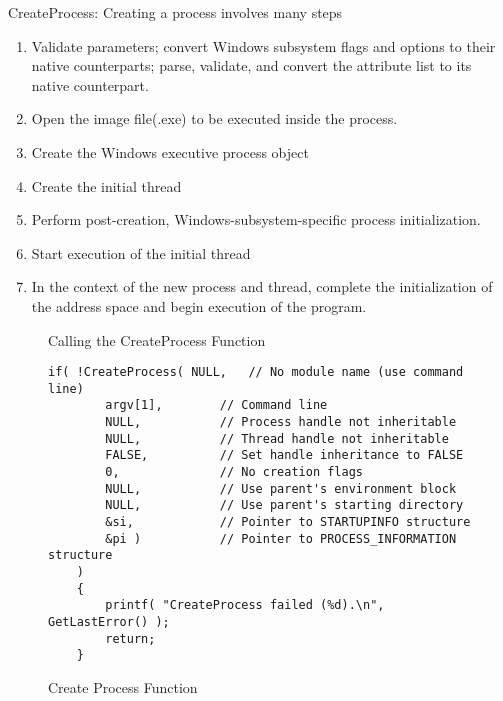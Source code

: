 \documentclass[letterpaper,10pt,draftclsnofoot,onecolumn]{IEEEtran}
\begin{document}
CreateProcess: Creating a process involves many steps
\begin{enumerate}
\item Validate parameters; convert Windows subsystem flags and options to their native counterparts; parse, validate, and convert the attribute list to its native counterpart.
\item Open the image file(.exe) to be executed inside the process.
\item Create the Windows executive process object
\item Create the initial thread
\item Perform post-creation, Windows-subsystem-specific process initialization.
\item Start execution of the initial thread
\item In the context of the new process and thread, complete the initialization of the address space and begin execution of the program.
\end{enumerate}
\begin{figure}[H]
\caption{Calling the CreateProcess Function}
\end{figure}
\begin{figure}[H]
\caption{Create Process Function}
\begin{lstlisting}
if( !CreateProcess( NULL,   // No module name (use command line)
        argv[1],        // Command line
        NULL,           // Process handle not inheritable
        NULL,           // Thread handle not inheritable
        FALSE,          // Set handle inheritance to FALSE
        0,              // No creation flags
        NULL,           // Use parent's environment block
        NULL,           // Use parent's starting directory 
        &si,            // Pointer to STARTUPINFO structure
        &pi )           // Pointer to PROCESS_INFORMATION structure
    ) 
    {
        printf( "CreateProcess failed (%d).\n", GetLastError() );
        return;
    }
\end{lstlisting}
\end{figure}
\end{document}
